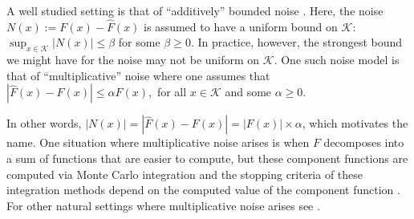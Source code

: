 \documentclass[final,12pt]{colt2018} %
\begin{document}
  
A well studied setting is that of  ``additively'' bounded noise \citep{applegate_kannan,singer2015information,risteski2016algorithms, hitting_times}.
%
Here, the noise $N(x):=F(x)-\hat{F}(x)$ is assumed to have  a uniform bound on $\mathcal{K}$: $\sup_{x \in \mathcal{K}} |N(x)| \leq \beta$ for some $\beta \geq 0$.
%
In practice, however, the strongest bound we might have for the noise may not be uniform on $\mathcal{K}$.     
%    
One such noise model is that of ``multiplicative''  noise  where one assumes that  $|\hat{F}(x) - F(x)| \leq \alpha F(x),$ for all $x\in  \mathcal{K}$  and some $\alpha \geq 0$.
{In other words, $|N(x)| = |\hat{F}(x) - F(x)| = |F(x)|\times \alpha$, which motivates the name.    %
% 
 One situation where multiplicative noise arises is when $F$ decomposes into a sum of  functions that are easier to compute, but these component functions are computed via Monte Carlo integration and the stopping criteria of these integration methods  depend on the computed value of the component function 
 \citep{chen_thesis}.
For other natural settings where multiplicative noise arises see \citep{chen2015stochastic,jebalia2008multiplicative,jebalia2011log}.
%

}
\end{document}
